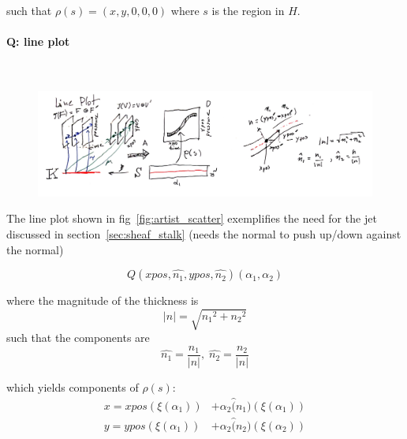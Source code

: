 \documentclass[../main.tex]{subfiles}
\begin{document}
such that $\rho(s) = (x, y, 0, 0, 0)$ where $s$ is the region in $H$. 

\paragraph{Q: line plot}\mbox{} \\
\label{sec:artist_example_line}
\begin{figure}[H]
    \includegraphics[width=\textwidth]{figures/math/line.png}
    \label{fig:artist_line}
\end{figure}

The line plot shown in fig~\ref{fig:artist_scatter} exemplifies the need for the jet discussed in section~\ref{sec:sheaf_stalk}
(needs the normal to push up/down against the normal)

\begin{equation}
    Q(xpos, \hat{n_{1}}, ypos, \hat{n_{2}})(\alpha_1, \alpha_2)
\end{equation}

where the magnitude of the thickness is 
\begin{equation}
    \lvert n \rvert = \sqrt{{n_{1}}^2 + {n_{2}}^2}
\end{equation}
such that the components are 
\begin{equation}
    \hat{n_{1}} = \frac{n_1}{\lvert n \rvert}, \; \hat{n_{2}} = \frac{n_2}{\lvert n \rvert}
\end{equation}
    
which yields components of $\rho(s)$:
\begin{align}
 x = xpos(\xi(\alpha_1)) &+ \alpha_2\hat(n_1)(\xi(\alpha_1)) \\
 y = ypos(\xi(\alpha_1)) &+ \alpha_2\hat(n_2)(\xi(\alpha_2)) 
\end{align}
\end{document}
